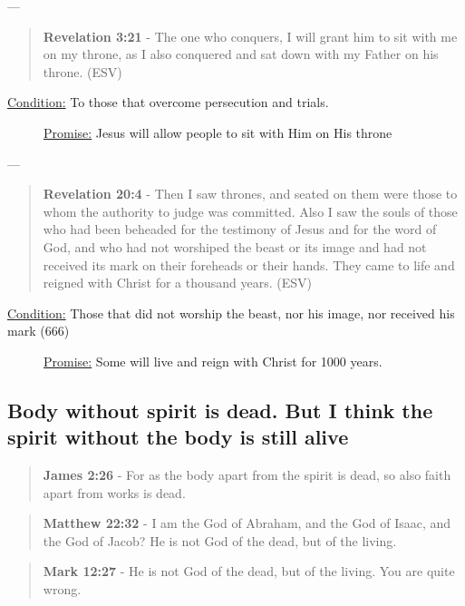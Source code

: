 \documentclass[11pt]{article}
\begin{document}
---

\begin{quote}
\textbf{Revelation 3:21} - The one who conquers, I will grant him to sit with me on my throne, as I also conquered and sat down with my Father on his throne. (ESV)
\end{quote}

\begin{description}
\item[{\uline{Condition:} To those that overcome persecution and trials.}] \uline{Promise:} Jesus will allow people to sit with Him on His throne
\end{description}

---

\begin{quote}
\textbf{Revelation 20:4} - Then I saw thrones, and seated on them were those to whom the authority to judge was committed. Also I saw the souls of those who had been beheaded for the testimony of Jesus and for the word of God, and who had not worshiped the beast or its image and had not received its mark on their foreheads or their hands. They came to life and reigned with Christ for a thousand years. (ESV)
\end{quote}

\begin{description}
\item[{\uline{Condition:} Those that did not worship the beast, nor his image, nor received his mark (666)}] \uline{Promise:} Some will live and reign with Christ for 1000 years.
\end{description}

\subsection{Body without spirit is dead. But I think the spirit without the body is still alive}
\label{sec:org699fbbc}
\begin{quote}
\textbf{James 2:26} - For as the body apart from the spirit is dead, so also faith apart from works is dead.
\end{quote}

\begin{quote}
\textbf{Matthew 22:32} - I am the God of Abraham, and the God of Isaac, and the God of Jacob? He is not God of the dead, but of the living.
\end{quote}

\begin{quote}
\textbf{Mark 12:27} - He is not God of the dead, but of the living. You are quite wrong.
\end{quote}
\end{document}
